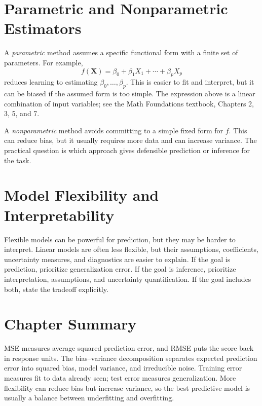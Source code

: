 {\section{Parametric and Nonparametric Estimators}

A \emph{parametric} method assumes a specific functional form with a finite set of parameters.  For example,
\begin{equation}
  f(\mathbf{X})=\beta_0+\beta_1X_1+\cdots+\beta_pX_p
  \label{eq:ch2-parametric-linear}
\end{equation}
reduces learning to estimating $\beta_0,\ldots,\beta_p$.  This is easier to fit and interpret, but it can be biased if the assumed form is too simple.  The expression above is a linear combination of input variables; see the Math Foundations textbook, Chapters 2, 3, 5, and 7.

A \emph{nonparametric} method avoids committing to a simple fixed form for $f$.  This can reduce bias, but it usually requires more data and can increase variance.  The practical question is which approach gives defensible prediction or inference for the task.

\section{Model Flexibility and Interpretability}

Flexible models can be powerful for prediction, but they may be harder to interpret.  Linear models are often less flexible, but their assumptions, coefficients, uncertainty measures, and diagnostics are easier to explain.  If the goal is prediction, prioritize generalization error.  If the goal is inference, prioritize interpretation, assumptions, and uncertainty quantification.  If the goal includes both, state the tradeoff explicitly.

\section{Chapter Summary}

MSE measures average squared prediction error, and RMSE puts the score back in response units.  The bias--variance decomposition separates expected prediction error into squared bias, model variance, and irreducible noise.  Training error measures fit to data already seen; test error measures generalization.  More flexibility can reduce bias but increase variance, so the best predictive model is usually a balance between underfitting and overfitting.
}
